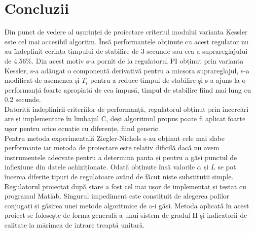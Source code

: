 \documentclass[11pt]{article}
\begin{document}
\section{Concluzii}
Din punct de vedere al ușurinței de proiectare criteriul modului varianta Kessler este cel mai accesibil algoritm. Însă performanțele obținute cu acest regulator nu au îndeplinit cerința timpului de stabilire de 3 secunde sau cea a suprareglajului de 4.56\%. Din acest motiv s-a pornit de la regulatorul PI obținut prin varianta Kessler, s-a adăugat o componentă derivativă pentru a micșora suprareglajul, s-a modificat de asemenea și $T_i$ pentru a reduce timpul de stabilire și s-a ajuns la o performanță foarte apropiată de cea impusă, timpul de stabilire fiind mai lung cu 0.2 secunde.\\
Datorită îndeplinirii criteriilor de performanță, regulatorul obținut prin încercări are și implementare în limbajul C, deși algoritmul propus poate fi aplicat foarte ușor pentru orice ecuație cu diferențe, fiind generic.\\
Pentru metoda experimentală Ziegler-Nichols s-au obținut cele mai slabe performanțe iar metoda de proiectare este relativ dificilă dacă nu avem instrumentele adecvate pentru a determina panta și  pentru a găsi punctul de inflexiune din datele achiziționate. Odată obținute însă valorile $\alpha$ și $L$ se pot încerca diferite tipuri de regulatoare având de făcut niște substituții simple.\\
Regulatorul proiectat după stare a fost cel mai ușor de implementat și testat cu programul Matlab. Singurul impediment este constituit de alegerea polilor conjugați și găsirea unei metode algoritmice de a-i găsi. Metoda aplicată în acest proiect se folosește de forma generală a unui sistem de gradul II și indicatorii de calitate la mărimea de intrare treaptă unitară.  
\newpage

\nocite{*}


\end{document}
